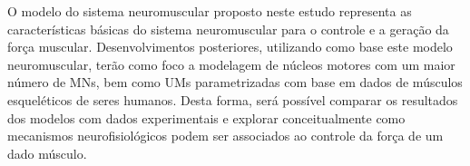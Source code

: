 O modelo do sistema neuromuscular proposto neste estudo representa as características básicas do sistema neuromuscular para o controle e a geração da força muscular. Desenvolvimentos posteriores, utilizando como base este modelo neuromuscular, terão como foco a modelagem de núcleos motores com um maior número de MNs, bem como UMs parametrizadas com base em dados de músculos esqueléticos de seres humanos. Desta forma, será possível comparar os resultados dos modelos com dados experimentais e explorar conceitualmente como mecanismos neurofisiológicos podem ser associados ao controle da força de um dado músculo.